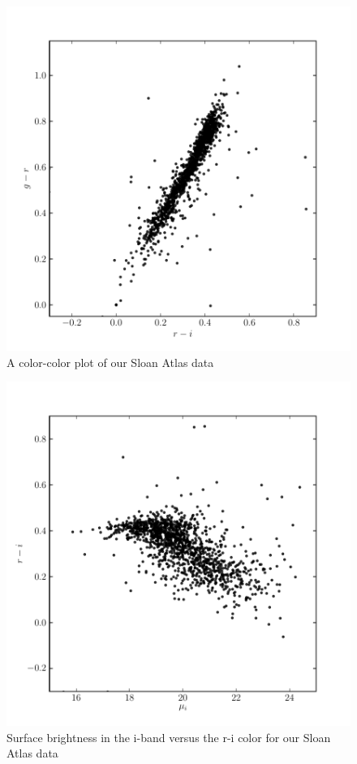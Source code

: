 \documentclass[12pt,preprint,pdftex]{aastex}
\begin{document}
\begin{figure}
\centering
\includegraphics[trim = 15mm 0mm 0mm 0mm]{method_color_sloan.pdf}
\caption{A color-color plot of our Sloan Atlas data}
\end{figure}

\begin{figure}
\centering
\includegraphics[trim = 15mm 0mm 0mm 0mm]{method_sb2_sloan.pdf}
\caption{Surface brightness in the i-band versus the r-i color for our Sloan Atlas data}
\end{figure}
\end{document}
